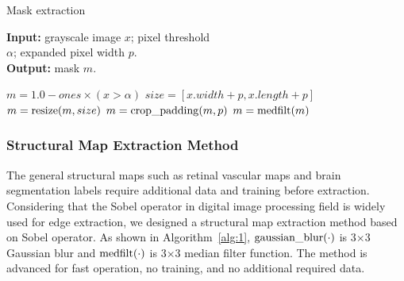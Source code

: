 \documentclass[runningheads]{llncs}
\begin{document}
	\vspace{-0.5cm}\begin{algorithm}[th]
		\caption{Mask extraction}
		\label{alg:2}
		\begin{multicols}{2}
			\hspace*{0.02in} {\bf Input: }grayscale image $x$; pixel threshold \\\hspace*{0.05in}$\alpha$; expanded pixel width $p$.\\
			\hspace*{0.02in} {\bf Output: }mask $m$.
			\begin{algorithmic}[1]
				\State $m = 1.0 - ones \times (x > \alpha)$
				\State $size=[x.width+p, x.length+p]$
				\State $m = {\rm resize}(m, size)$
				\State $m = {\rm crop\_padding}(m,p)$
				\State $m = {\rm medfilt}(m)$
			\end{algorithmic} 
		\end{multicols}
		\vspace{-0.3cm}
	\end{algorithm}\vspace{-0.75cm}
	\subsubsection{Structural Map Extraction Method}
	The general structural maps such as retinal vascular maps\cite{41costa2017towards} and brain segmentation labels \cite{4shin2018medical} require additional data and training before extraction. Considering that the Sobel operator\cite{147Sobel} in digital image processing field is widely used for edge extraction, we designed a structural map extraction method based on Sobel operator. As shown in Algorithm~\ref{alg:1}, ${\rm gaussian\_blur}(\cdot)$ is 3$\times$3 Gaussian blur and ${\rm medfilt}(\cdot)$ is 3$\times$3 median filter function. The method is advanced for fast operation, no training, and no additional required data. 
\end{document}
